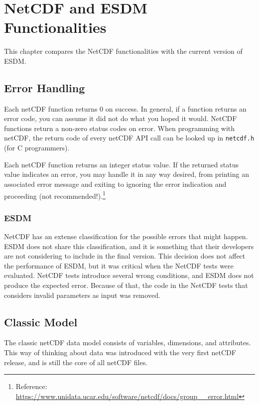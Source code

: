 \chapter{NetCDF and ESDM Functionalities}

\tab
This chapter compares the NetCDF functionalities with the current version of ESDM.

\section{Error Handling}

\tab
Each netCDF function returns 0 on success. In general, if a function returns an error code, you can assume it did not do what you hoped it would. NetCDF functions return a non-zero status codes on error. When programming with netCDF, the return code of every netCDF API call can be looked up in \texttt{netcdf.h} (for C programmers).

Each netCDF function returns an integer status value. If the returned status value indicates an error, you may handle it in any way desired, from printing an associated error message and exiting to ignoring the error indication and proceeding (not recommended!).\footnote{Reference: \url{https://www.unidata.ucar.edu/software/netcdf/docs/group__error.html}}

\subsection{ESDM}

\tab
NetCDF has an extense classification for the possible errors that might happen. ESDM does not share this classification, and it is something that their developers are not considering to include in the final version. This decision does not affect the performance of ESDM, but it was critical when the NetCDF tests were evaluated. NetCDF tests introduce several wrong conditions, and ESDM does not produce the expected error. Because of that, the code in the NetCDF tests that considers invalid parameters as input was removed.

\section{Classic Model}

The classic netCDF data model consists of variables, dimensions, and attributes. This way of thinking about data was introduced with the very first netCDF release, and is still the core of all netCDF files.

